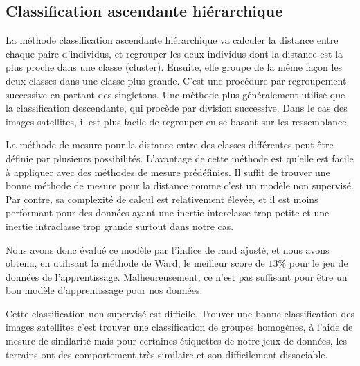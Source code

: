 \documentclass[twocolumn,10pt]{article}
\begin{document}
\subsection{Classification ascendante hiérarchique}
La méthode classification ascendante hiérarchique va calculer la distance entre chaque paire d'individus, et regrouper les deux individus dont la distance est la plus proche dans une classe (cluster). Ensuite, elle groupe de la même façon les deux classes dans une classe plus grande. C'est une procédure par regroupement successive en partant des singletons. Une méthode plus généralement utilisé que la classification descendante, qui procède par division successive. Dans le cas des images satellites, il est plus facile de regrouper en se basant sur les ressemblance.  

La méthode de mesure pour la distance entre des classes différentes peut être définie par plusieurs possibilités. L'avantage de cette méthode est qu'elle est facile à appliquer avec des méthodes de mesure prédéfinies. Il suffit de trouver une bonne méthode de mesure pour la distance comme c'est un modèle non supervisé. Par contre, sa complexité de calcul est relativement élevée, et il est moins performant pour des données ayant une inertie interclasse trop petite et une inertie intraclasse trop grande surtout dans notre cas.

Nous avons donc évalué ce modèle par l'indice de rand ajusté, et nous avons obtenu, en utilisant la méthode de Ward, le meilleur score de $13\%$ pour le jeu de données de l'apprentissage. Malheureusement, ce n'est pas suffisant pour être un bon modèle d'apprentissage pour nos données.

\begin{figure}[htbp]
	\centering
\end{figure}
 
Cette classification non supervisé est difficile. Trouver une bonne classification des images satellites c'est trouver une classification de groupes homogènes, à l'aide de mesure de similarité mais pour certaines étiquettes de notre jeux de données, les terrains ont des comportement très similaire et son difficilement dissociable. 
\end{document}
